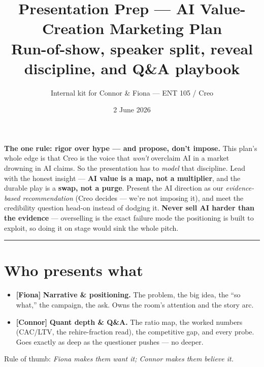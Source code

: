 \documentclass[11pt]{article}
\title{\textbf{\color{creonavy} Presentation Prep --- AI Value-Creation Marketing Plan}\\[3pt]
\large Run-of-show, speaker split, reveal discipline, and Q\&A playbook}
\author{\normalsize Internal kit for Connor \& Fiona --- ENT 105 / Creo}
\date{\normalsize 2 June 2026}
\newcommand{\F}{\textcolor{creoaccent}{\textbf{[Fiona]}}}
\newcommand{\C}{\textcolor{creonavy}{\textbf{[Connor]}}}
\begin{document}
\maketitle
\vspace{-1.5em}

\begin{keyrule}
\textbf{The one rule: rigor over hype --- and propose, don't impose.} This plan's whole edge is
that Creo is the voice that \emph{won't} overclaim AI in a market drowning in AI claims. So the
presentation has to \emph{model} that discipline. Lead with the honest insight --- \textbf{AI
value is a map, not a multiplier}, and the durable play is a \textbf{swap, not a purge}. Present
the AI direction as our \emph{evidence-based recommendation} (Creo decides --- we're not imposing
it), and meet the credibility question head-on instead of dodging it. \textbf{Never sell AI
harder than the evidence} --- overselling is the exact failure mode the positioning is built to
exploit, so doing it on stage would sink the whole pitch.
\end{keyrule}

\tableofcontents
\vspace{0.6em}\hrule\vspace{0.8em}

\section{Who presents what}
\begin{itemize}
  \item \F{} \textbf{Narrative \& positioning.} The problem, the big idea, the ``so what,'' the
  campaign, the ask. Owns the room's attention and the story arc.
  \item \C{} \textbf{Quant depth \& Q\&A.} The ratio map, the worked numbers (CAC/LTV, the
  rehire-fraction read), the competitive gap, and every probe. Goes exactly as deep as the
  questioner pushes --- no deeper.
\end{itemize}
Rule of thumb: \emph{Fiona makes them want it; Connor makes them believe it.}

\end{document}
